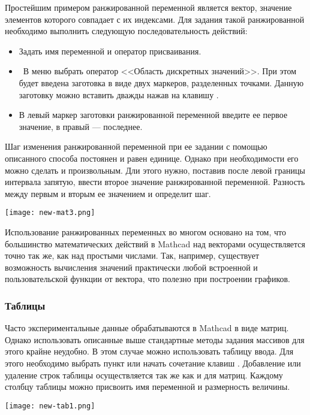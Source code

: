 Простейшим примером ранжированной переменной является вектор, значение элементов которого совпадает с их индексами. Для задания такой ранжированной необходимо выполнить следующую последовательность действий:
\begin{itemize}
	\item Задать имя переменной и оператор присваивания.
	\item  В меню   выбрать оператор <<Область дискретных значений>>. При этом будет введена заготовка в виде двух маркеров, разделенных точками.	Данную заготовку можно вставить дважды нажав на клавишу .
	\item В левый  маркер заготовки ранжированной переменной введите ее первое значение, в правый --- последнее.
\end{itemize}

Шаг изменения ранжированной переменной при ее задании с помощью описанного способа постоянен и равен единице. Однако при необходимости его можно сделать и произвольным. Дли этого нужно, поставив после левой границы интервала запятую, ввести второе значение ранжированной переменной. Разность между первым и вторым ее значением и определит шаг. 
\begin{center}
	\texttt{[image: new-mat3.png]}
\end{center}

Использование ранжированных переменных во многом основано на том, что большинство математических действий в Mathcad над векторами осуществляется точно так же, как над простыми числами. Так, например, существует возможность вычисления значений практически любой встроенной и пользовательской функции от вектора, что полезно при построении графиков.

\subsubsection*{Таблицы}
Часто экспериментальные данные обрабатываются в Mathcad в виде матриц. Однако использовать описанные выше стандартные методы задания массивов для этого крайне неудобно. В этом случае можно использовать таблицу ввода. Для этого необходимо выбрать пункт  или начать сочетание клавиш . Добавление или удаление строк таблицы осуществляется так же как и для матриц. Каждому столбцу таблицы можно присвоить имя переменной и размерность величины.
\begin{center}
	\texttt{[image: new-tab1.png]}
\end{center}


